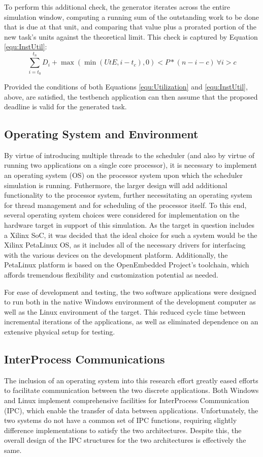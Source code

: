 To perform this additional check, the generator iterates across the entire simulation window, computing a running sum of the outstanding work to be done that is due at that unit, and comparing that value plus a prorated portion of the new task's units against the theoretical limit. This check is captured by Equation \ref{equ:InstUtil}:
\begin{equation}\label{equ:InstUtil}
    \sum_{i=t_0}^{t_n}D_i + \max(\min(UtE, i - t_c), 0) < P*(n-i-c)\:\forall i>c
\end{equation}

Provided the conditions of both Equations \ref{equ:Utilization} and \ref{equ:InstUtil}, above, are satisfied, the testbench application can then assume that the proposed deadline is valid for the generated task.

\subsection{Operating System and Environment}\label{subsec:LinuxImpl}
By virtue of introducing multiple threads to the scheduler (and also by virtue of running two applications on a single core processor), it is necessary to implement an operating system (OS) on the processor system upon which the scheduler simulation is running. Futhermore, the larger design will add additional functionality to the processor system, further necessitating an operating system for thread management and for scheduling of the processor itself. To this end, several operating system choices were considered for implementation on the hardware target in support of this simulation. As the target in question includes a Xilinx SoC, it was decided that the ideal choice for such a system would be the Xilinx PetaLinux OS, as it includes all of the necessary drivers for interfacing with the various devices on the development platform. Additionally, the PetaLinux platform is based on the OpenEmbedded Project's toolchain, which affords tremendous flexibility and customization potential as needed.

For ease of development and testing, the two software applications were designed to run both in the native Windows environment of the development computer as well as the Linux environment of the target. This reduced cycle time between incremental iterations of the applications, as well as eliminated dependence on an extensive physical setup for testing.

\subsection{InterProcess Communications}\label{subsec:IPC}
The inclusion of an operating system into this research effort greatly eased efforts to facilitate communication between the two discrete applications. Both Windows and Linux implement comprehensive facilities for InterProcess Communication (IPC), which enable the transfer of data between applications. Unfortunately, the two systems do not have a common set of IPC functions, requiring slightly difference implementations to satisfy the two architectures. Despite this, the overall design of the IPC structures for the two architectures is effectively the same.

